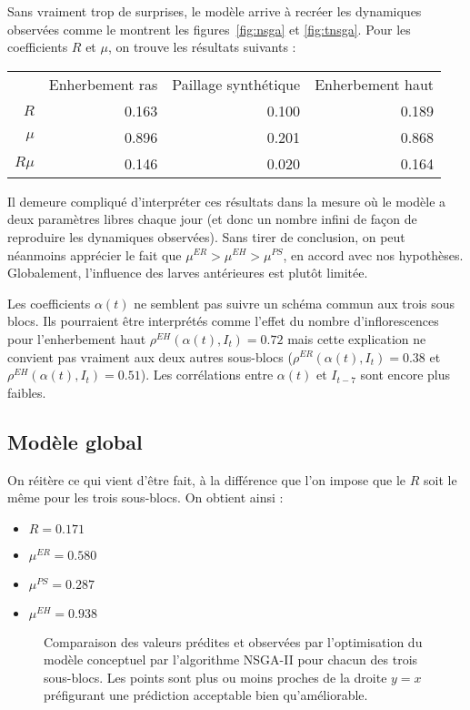 \documentclass[a4paper, 11pt]{article}
\begin{document}
Sans vraiment trop de surprises, le modèle arrive à recréer les dynamiques observées comme le montrent les figures~\ref{fig:nsga} et \ref{fig:tnsga}. Pour les coefficients $R$ et $\mu$, on trouve les résultats suivants :
\begin{center}
\begin{tabular}{rrrr}
 & Enherbement ras & Paillage synthétique & Enherbement haut\\
$R$ & 0.163 & 0.100 & 0.189\\
$\mu$ & 0.896 & 0.201 & 0.868\\
$R\mu$ & 0.146 & 0.020 & 0.164
\end{tabular}
\end{center}
Il demeure compliqué d'interpréter ces résultats dans la mesure où le modèle a deux paramètres libres chaque jour (et donc un nombre infini de façon de reproduire les dynamiques observées). Sans tirer de conclusion, on peut néanmoins apprécier le fait que $\mu^{ER} > \mu^{EH} > \mu^{PS}$, en accord avec nos hypothèses. Globalement, l'influence des larves antérieures est plutôt limitée.

Les coefficients $\alpha(t)$ ne semblent pas suivre un schéma commun aux trois sous blocs. Ils pourraient être interprétés comme l'effet du nombre d'inflorescences pour l'enherbement haut $\rho^{EH}\left( \alpha(t), I_t \right) = 0.72$ mais cette explication ne convient pas vraiment aux deux autres sous-blocs ($\rho^{ER}\left( \alpha(t), I_t \right) = 0.38$ et $\rho^{EH}\left( \alpha(t), I_t \right) = 0.51$). Les corrélations entre $\alpha(t)$ et $I_{t-7}$ sont encore plus faibles.

\subsection{Modèle global}

On réitère ce qui vient d'être fait, à la différence que l'on impose que le $R$ soit le même pour les trois sous-blocs. On obtient ainsi :
\begin{itemize}
 \item $R = 0.171$
 \item $\mu^{ER} = 0.580$
 \item $\mu^{PS} = 0.287$
 \item $\mu^{EH} = 0.938$
\end{itemize}



\begin{figure}[ht]
 \centering
 \caption{Comparaison des valeurs prédites et observées par l'optimisation du modèle conceptuel par l'algorithme NSGA-II pour chacun des trois sous-blocs. Les points sont plus ou moins proches de la droite $y=x$ préfigurant une prédiction acceptable bien qu'améliorable.}
 \label{fig:p}
\end{figure}
\end{document}
